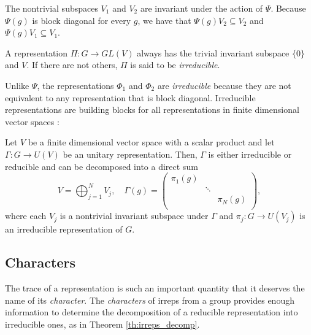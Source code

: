 The nontrivial subspaces $V_1$ and $V_2$ are invariant under the action of $\Psi$. Because $\Psi(g)$ is block diagonal for every $g$, we have that $\Psi(g) V_2 \subseteq V_2$ and $\Psi(g) V_1 \subseteq V_1$.
\begin{definition}
A representation $\Pi: G \to GL(V)$ always has the trivial invariant subspace $\{0\}$ and $V$. If there are not others, $\Pi$ is said to be \textit{irreducible}.
\end{definition}

Unlike $\Psi$, the representations $\Phi_1$ and $\Phi_2$ are \textit{irreducible} because they are not equivalent to any representation that is block diagonal. Irreducible representations are building blocks for all representations in finite dimensional vector spaces \cite{dresselhaus}:
\begin{theorem} \label{th:irreps_decomp}
Let $V$ be a finite dimensional vector space with a scalar product and let $\Gamma: G \to U(V)$ be an unitary representation. Then, $\Gamma$ is either irreducible or reducible and can be decomposed into a direct sum
$$
V = \bigoplus_{j=1}^N V_j, \quad
\Gamma(g) =
\begin{pmatrix}
\pi_1(g) &  &  \\
 & \ddots &  \\
 &  & \pi_N(g) \\
\end{pmatrix},
$$
where each $V_j$ is a nontrivial invariant subspace under $\Gamma$ and $\pi_j: G \to U(V_j)$ is an irreducible representation of $G$.
\end{theorem}

\subsection{Characters}

The trace of a representation is such an important quantity that it deserves the name of its \textit{character}. The \textit{characters} of irreps from a group provides enough information to determine the decomposition of a reducible representation into irreducible ones, as in Theorem \ref{th:irreps_decomp}.

